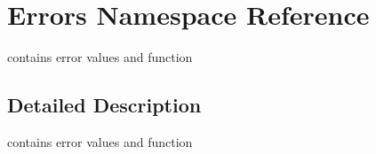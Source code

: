 \hypertarget{namespace_errors}{}\section{Errors Namespace Reference}
\label{namespace_errors}


contains error values and function  




\subsection{Detailed Description}
contains error values and function 